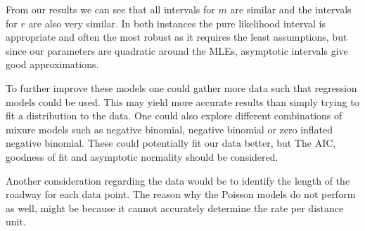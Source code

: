 \documentclass[11pt,preprint, authoryear]{elsarticle}
\numberwithin{equation}{section}
\numberwithin{figure}{section}
\numberwithin{table}{section}
\begin{document}
From our results we can see that all intervals for \(m\) are similar and
the intervals for \(r\) are also very similar. In both instances the
pure likelihood interval is appropriate and often the most robust as it
requires the least assumptions, but since our parameters are quadratic
around the MLEs, asymptotic intervals give good approximations.

To further improve these models one could gather more data such that
regression models could be used. This may yield more accurate results
than simply trying to fit a distribution to the data. One could also
explore different combinations of mixure models such as negative
binomial, negative binomial or zero inflated negative binomial. These
could potentially fit our data better, but The AIC, goodness of fit and
asymptotic normality should be considered.

Another consideration regarding the data would be to identify the length
of the roadway for each data point. The reason why the Poisson models do
not perform as well, might be because it cannot accurately determine the
rate per distance unit.

\newpage
\nocite{*}

\end{document}
